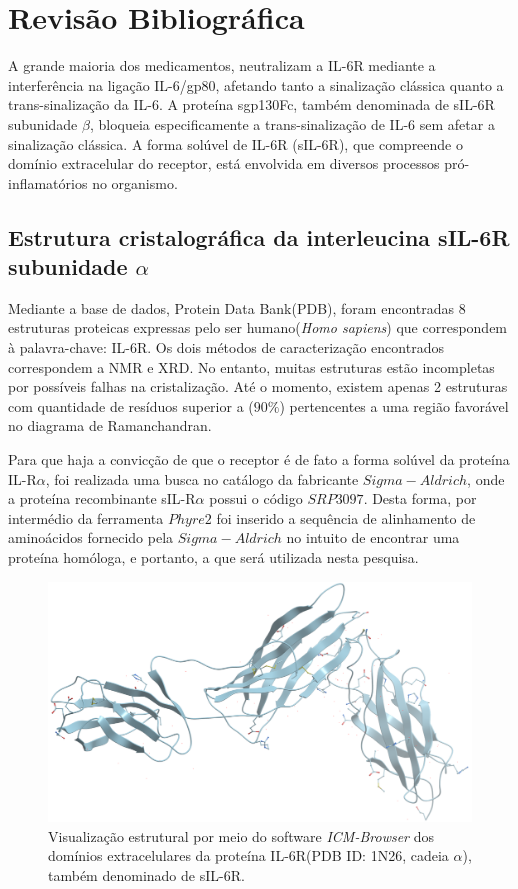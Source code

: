 \chapter{Revisão Bibliográfica}

A grande maioria dos medicamentos, neutralizam a IL-6R mediante a interferência na ligação IL-6/gp80, afetando tanto a sinalização clássica quanto a trans-sinalização da IL-6. A proteína sgp130Fc, também denominada de sIL-6R subunidade $\beta$, bloqueia especificamente a trans-sinalização de IL-6 sem afetar a sinalização clássica. \cite{Simon2011} A forma solúvel de IL-6R (sIL-6R), que compreende o domínio extracelular do receptor, está envolvida em diversos processos pró-inflamatórios no organismo. \cite{Stefan2012} 

\section{Estrutura cristalográfica da interleucina sIL-6R subunidade $\alpha$}

Mediante a base de dados, Protein Data Bank(PDB), foram encontradas 8 estruturas proteicas expressas pelo ser humano(\textit{Homo sapiens}) que correspondem à palavra-chave: IL-6R. Os dois métodos de caracterização encontrados correspondem a NMR e XRD. No entanto, muitas estruturas estão incompletas por possíveis falhas na cristalização. Até o momento, existem apenas 2 estruturas com quantidade de resíduos superior a ($90\%$) pertencentes a uma região favorável no diagrama de Ramanchandran.

Para que haja a convicção de que o receptor é de fato a forma solúvel da proteína IL-R$\alpha$, foi realizada uma busca no catálogo da fabricante $Sigma-Aldrich$, onde a proteína recombinante sIL-R$\alpha$ possui o código $SRP3097$. Desta forma, por intermédio da ferramenta $Phyre2$ foi inserido a sequência de alinhamento de aminoácidos fornecido pela $Sigma-Aldrich$ no intuito de encontrar uma proteína homóloga, e portanto, a que será utilizada nesta pesquisa.     

\begin{figure}[H]
\centering
\includegraphics[scale=1.2]{Figuras/il6-ra.png}
\caption{Visualização estrutural por meio do software \textit{ICM-Browser} dos domínios extracelulares da proteína IL-6R(PDB ID: 1N26, cadeia $\alpha$), também denominado de sIL-6R. \cite{Varghese2002}}
\end{figure}

